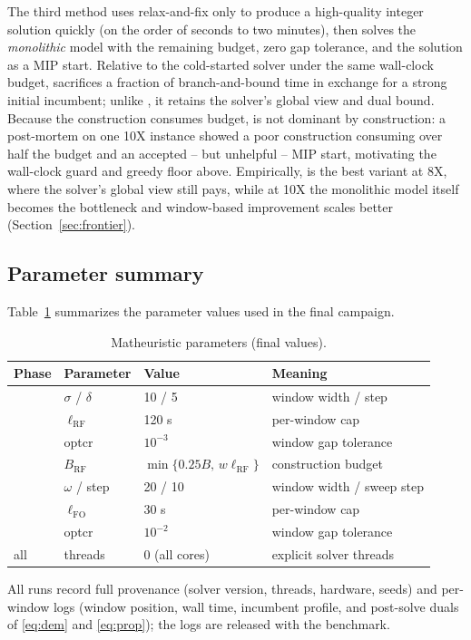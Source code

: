 The third method uses relax-and-fix only to produce a high-quality
integer solution quickly (on the order of seconds to two minutes),
then solves the \emph{monolithic} model with the remaining budget,
zero gap tolerance, and the \RF{} solution as a MIP start. Relative
to the cold-started solver under the same wall-clock budget, \RFMIP{}
sacrifices a fraction of branch-and-bound time in exchange for a
strong initial incumbent; unlike \RFFO{}, it retains the solver's
global view and dual bound. Because the construction consumes budget, \RFMIP{} is not
dominant by construction: a post-mortem on one 10X instance showed a
poor construction consuming over half the budget and an accepted --
but unhelpful -- MIP start, motivating the wall-clock guard and
greedy floor above. Empirically, \RFMIP{} is the best variant at 8X,
where the solver's global view still pays, while at 10X the
monolithic model itself becomes the bottleneck and window-based
\FO{} improvement scales better (Section~\ref{sec:frontier}).

\subsection{Parameter summary}
\label{sec:params}

Table~\ref{tab:params} summarizes the parameter values used in the
final campaign.

\begin{table}[t]
\centering
\caption{Matheuristic parameters (final values).}
\label{tab:params}
\begin{tabular}{llll}
\toprule
Phase & Parameter & Value & Meaning \\
\midrule
\RF{} & $\sigma$ / $\delta$ & 10 / 5 & window width / step \\
\RF{} & $\ell_{\mathrm{RF}}$ & 120 s & per-window cap \\
\RF{} & optcr & $10^{-3}$ & window gap tolerance \\
\RF{} & $B_{\mathrm{RF}}$ & $\min\{0.25B,\,w\ell_{\mathrm{RF}}\}$ &
construction budget \\
\FO{} & $\omega$ / step & 20 / 10 & window width / sweep step \\
\FO{} & $\ell_{\mathrm{FO}}$ & 30 s & per-window cap \\
\FO{} & optcr & $10^{-2}$ & window gap tolerance \\
all & threads & 0 (all cores) & explicit solver threads \\
\bottomrule
\end{tabular}
\end{table}

\noindent All runs record full provenance (solver version, threads,
hardware, seeds) and per-window logs (window position, wall time,
incumbent profile, and post-solve duals of \eqref{eq:dem} and
\eqref{eq:prop}); the logs are released with the benchmark.
